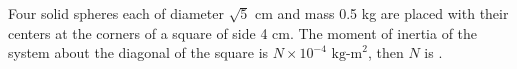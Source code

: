 
\item Four solid spheres each of diameter $\sqrt{5}$ cm and mass 0.5 kg are placed with their centers at the corners of a square of side 4 cm. The moment of inertia of the system about the diagonal of the square is $N \times 10^{-4} \text{ kg-m}^2$, then $N$ is \underline{\hspace{2.5cm}}.

